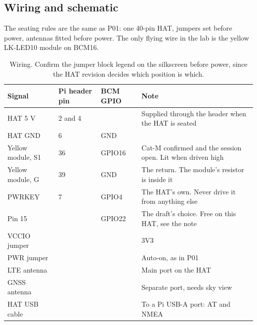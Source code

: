 \subsection*{Wiring and schematic}

The seating rules are the same as P01: one 40-pin HAT, jumpers set before power, antennas fitted before power. The only flying wire in the lab is the yellow LK-LED10 module on BCM16.


\begin{table}[H]\centering\small
\begin{tabular}{p{40mm}p{24mm}p{22mm}p{62mm}}
\toprule
Signal & Pi header pin & BCM GPIO & Note \\
\midrule
HAT 5 V & 2 and 4 & & Supplied through the header when the HAT is seated \\
HAT GND & 6 & GND & \\
Yellow module, S1 & 36 & GPIO16 & Cat-M confirmed and the session open. Lit when driven high \\
Yellow module, G & 39 & GND & The return. The module's resistor is inside it \\
PWRKEY & 7 & GPIO4 & The HAT's own. Never drive it from anything else \\
Pin 15 & & GPIO22 & The draft's choice. Free on this HAT, see the note \\
VCCIO jumper & & & 3V3 \\
PWR jumper & & & Auto-on, as in P01 \\
LTE antenna & & & Main port on the HAT \\
GNSS antenna & & & Separate port, needs sky view \\
HAT USB cable & & & To a Pi USB-A port: AT and NMEA \\
\bottomrule
\end{tabular}
\caption{Wiring. Confirm the jumper block legend on the silkscreen before power, since the HAT revision decides which position is which.}
\end{table}

